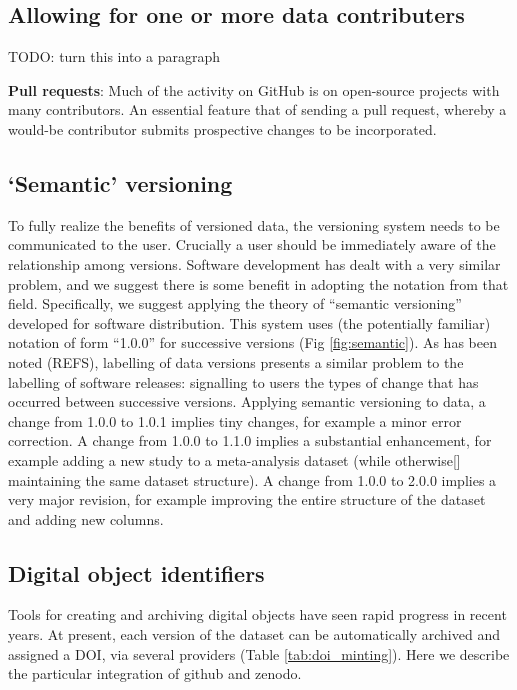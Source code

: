 \documentclass[a4paper,11pt]{article}
\begin{document}
\subsection{Allowing for one or more data contributers}

TODO: turn this into a paragraph

\textbf{Pull requests}: Much of the activity on GitHub is on open-source projects with many contributors. An essential feature that of sending a pull request, whereby a would-be contributor submits prospective changes to be incorporated.

\subsection{`Semantic' versioning}

To fully realize the benefits of versioned data, the versioning system needs to be communicated to the user.  Crucially a user should be immediately aware of the relationship among versions.  Software development has dealt with a very similar problem, and we suggest there is some benefit in adopting the notation from that field.  Specifically, we suggest applying the theory of ``semantic versioning'' developed for software distribution. This system uses (the potentially familiar) notation of form ``1.0.0'' for successive versions (Fig \ref{fig:semantic}). As has been noted (REFS), labelling of data versions presents a similar problem to the labelling of software releases: signalling to users the types of change that has occurred between successive versions. Applying semantic versioning to data, a change from 1.0.0 to 1.0.1 implies tiny changes, for example a minor error correction. A change from 1.0.0 to 1.1.0 implies a substantial enhancement, for example adding a new study to a meta-analysis dataset (while otherwise[] maintaining the same dataset structure). A change from 1.0.0 to 2.0.0 implies a very major revision, for example improving the entire structure of the dataset and adding new columns.

\subsection{Digital object identifiers}


Tools for creating and archiving digital objects have seen rapid progress in recent years.  At present, each version of the dataset can be automatically archived and assigned a DOI, via several providers (Table \ref{tab:doi_minting}).  Here we describe the particular integration of github and zenodo.  
\end{document}
